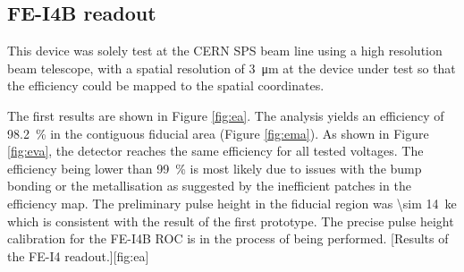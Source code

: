 \subsection{FE-I4B readout}
This device was solely test at the CERN SPS beam line using a high resolution beam telescope, with a spatial resolution of \SI{3}{\micro\meter} at the device under test so that the efficiency could be mapped to the spatial coordinates. \par
The first results are shown in Figure \ref{fig:ea}. The analysis yields an efficiency of \SI{98.2}{\%} in the contiguous fiducial area (Figure \ref{fig:ema}). As shown in Figure \ref{fig:eva}, the detector reaches the same efficiency for all tested voltages. The efficiency being lower than \SI{99}{\%} is most likely due to issues with the bump bonding or the metallisation as suggested by the inefficient patches in the efficiency map. The preliminary pulse height in the fiducial region was \SI{\sim 14}{\kilo e} which is consistent with the result of the first prototype. The precise pulse height calibration for the FE-I4B \ac{ROC} is in the process of being performed.
[Results of the FE-I4 readout.][fig:ea]
